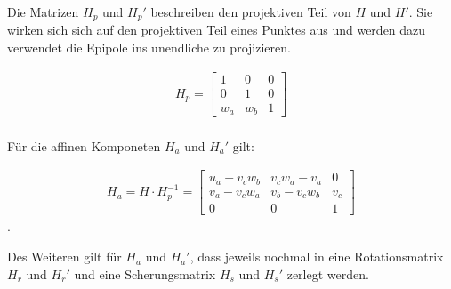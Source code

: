 Die Matrizen $H_p$ und $H_p'$ beschreiben den projektiven Teil von $H$ und $H'$. Sie wirken sich sich auf den projektiven Teil eines Punktes aus und werden dazu verwendet die Epipole ins unendliche zu projizieren\cite{ZZ,phdextrinsicPara}.

%
%

\begin{gather}
	H_p = 
	\begin{bmatrix}
		1&0&0\\
		0&1&0\\
		w_a&w_b&1
	\end{bmatrix}
\end{gather}\\

Für die affinen Komponeten $H_a$ und $H_a'$ gilt:

\begin{gather}
	H_a= H \cdot H^{-1}_p = 
	\begin{bmatrix}
		u_a-v_cw_b&v_cw_a-v_a&0\\
		v_a-v_cw_a&v_b-v_cw_b&v_c\\
		0&0&1
	\end{bmatrix}
\end{gather}
.


Des Weiteren gilt für $H_a$ und $H_a'$, dass jeweils nochmal in eine Rotationsmatrix $H_r$ und $H_r'$ und eine Scherungsmatrix $H_s$ und $H_s'$ zerlegt werden\cite{ZZ,phdextrinsicPara}.


